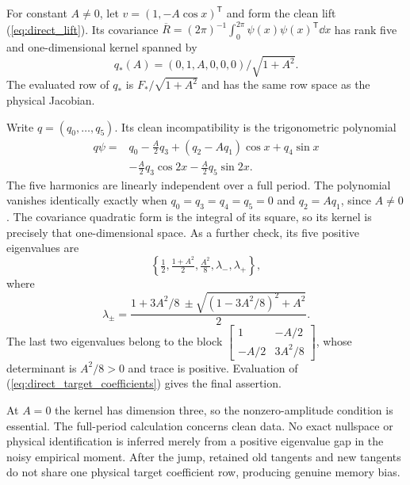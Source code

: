 \begin{directproposition}
\label{prop:direct_nullspace}
For constant $A\ne0$, let $v=(1,-A\cos x)^{\mathsf T}$ and form the
clean lift (\ref{eq:direct_lift}). Its covariance
$\overline R=(2\pi)^{-1}\int_0^{2\pi}\psi(x)\psi(x)^{\mathsf T}\dd x$
has rank five and one-dimensional kernel spanned by
\begin{equation}
 q_*(A)=(0,1,A,0,0,0)/\sqrt{1+A^2}.
 \label{eq:direct_target_coefficients}
\end{equation}
The evaluated row of $q_*$ is $F_*/\sqrt{1+A^2}$ and has the same row
space as the physical Jacobian.
\end{directproposition}
\begin{IEEEproof}
Write $q=(q_0,\ldots,q_5)$. Its clean incompatibility is the trigonometric
polynomial
\begin{align*}
 q\psi={}&q_0-\tfrac A2q_3+(q_2-Aq_1)\cos x+q_4\sin x\\
 &-\tfrac A2q_3\cos2x-\tfrac A2q_5\sin2x.
\end{align*}
The five harmonics are linearly independent over a full period. The
polynomial vanishes identically exactly when
$q_0=q_3=q_4=q_5=0$ and $q_2=Aq_1$, since $A\ne0$.
The covariance quadratic form is the integral of its square, so its
kernel is precisely that one-dimensional space. As a further check, its
five positive eigenvalues are
\begin{equation}
 \left\{\tfrac12,\tfrac{1+A^2}{2},\tfrac{A^2}{8},\lambda_-,\lambda_+\right\},
\end{equation}
where
\begin{equation}
 \lambda_\pm=\frac{1+3A^2/8\ \pm
 \sqrt{(1-3A^2/8)^2+A^2}}{2}.
\end{equation}
The last two eigenvalues belong to the block
$\left[\begin{smallmatrix}1&-A/2\\-A/2&3A^2/8\end{smallmatrix}\right]$,
whose determinant is $A^2/8>0$ and trace is positive. Evaluation of
(\ref{eq:direct_target_coefficients}) gives the final assertion.
\end{IEEEproof}
At $A=0$ the kernel has dimension three, so the nonzero-amplitude
condition is essential. The full-period calculation concerns clean
data. No exact nullspace or physical identification is inferred merely
from a positive eigenvalue gap in the noisy empirical moment. After the
jump, retained old tangents and new tangents do not share one physical
target coefficient row, producing genuine memory bias.

